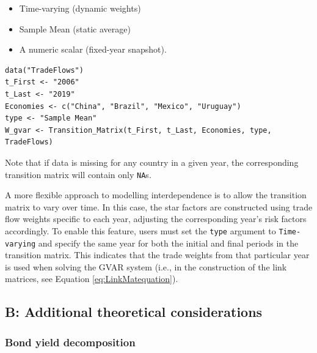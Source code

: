 \begin{itemize}
\tightlist
\item
  Time-varying (dynamic weights)
\item
  Sample Mean (static average)
\item
  A numeric scalar (fixed-year snapshot).
\end{itemize}

\begin{verbatim}
data("TradeFlows")
t_First <- "2006"
t_Last <- "2019"
Economies <- c("China", "Brazil", "Mexico", "Uruguay")
type <- "Sample Mean"
W_gvar <- Transition_Matrix(t_First, t_Last, Economies, type, TradeFlows)
\end{verbatim}

Note that if data is missing for any country in a given year, the corresponding transition matrix will contain only \texttt{NA}s.

A more flexible approach to modelling interdependence is to allow the transition matrix to vary over time. In this case, the star factors are constructed using trade flow weights specific to each year, adjusting the corresponding year's risk factors accordingly. To enable this feature, users must set the \texttt{type} argument to \texttt{Time-varying} and specify the same year for both the initial and final periods in the transition matrix. This indicates that the trade weights from that particular year is used when solving the GVAR system (i.e., in the construction of the link matrices, see Equation \eqref{eq:LinkMatequation}).

\subsection*{B: Additional theoretical considerations}\label{b-additional-theoretical-considerations}

\subsubsection{Bond yield decomposition}\label{bond-yield-decomposition}

